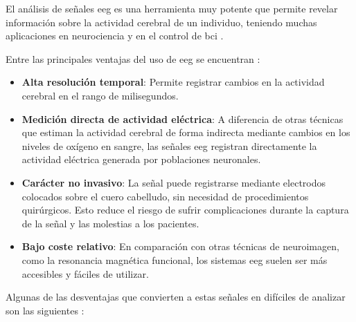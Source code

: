 El análisis de señales \acrshort{eeg} es una herramienta muy potente que permite revelar información sobre la actividad cerebral de un individuo, teniendo muchas aplicaciones en neurociencia y en el control de \acrshort{bci} \cite{craik_DeepLearning2019}.

Entre las principales ventajas del uso de \acrshort{eeg} se encuentran \cite{sherman_EEGSignal2020,luck_IntroductionEventRelated2014, telpaz_UsingEEG2015,schirrmeister_DeepLearning2017}:

\begin{itemize}
    \item \textbf{Alta resolución temporal}: Permite registrar cambios en la actividad cerebral en el rango de milisegundos.

          \item\textbf{Medición directa de actividad eléctrica}: A diferencia de otras técnicas que estiman la actividad cerebral de forma indirecta mediante cambios en los niveles de oxígeno en sangre, las señales \acrshort{eeg} registran directamente la actividad eléctrica generada por poblaciones neuronales.

    \item \textbf{Carácter no invasivo}: La señal puede registrarse mediante electrodos colocados sobre el cuero cabelludo, sin necesidad de procedimientos quirúrgicos. Esto reduce el riesgo de sufrir complicaciones durante la captura de la señal y las molestias a los pacientes.

    \item \textbf{Bajo coste relativo}: En comparación con otras técnicas de neuroimagen, como la resonancia magnética funcional, los sistemas \acrshort{eeg} suelen ser más accesibles y fáciles de utilizar.

\end{itemize}

Algunas de las desventajas que convierten a estas señales en difíciles de analizar son las siguientes \cite{luck_IntroductionEventRelated2014,saha_IntraIntersubject2020,klonowski_EverythingYou2009}:



